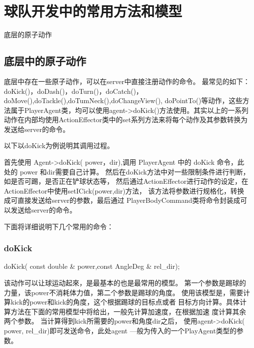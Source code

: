 \section{球队开发中的常用方法和模型}
底层的原子动作



\subsection{底层中的原子动作}
底层中存在一些原子动作，可以在server中直接注册动作的命令。
最常见的如下：doKick()，doDash()，doTurn()，doCatch()， doMove(),doTackle(),doTumNeck(),doChangeView(), doPointTo()等动作，这些方法属于PlayerAgent类，均可以使用agent->doKick()方法使用。其实以上的一系列动作在内部均使用ActionEffector类中的set系列方法来将每个动作及其参数转换为发送给server的命令。

以下以doKick为例说明其调用过程。

首先使用 Agent->doKick( power，dir),调用 PlayerAgent 中的 doKick 命令，此处的 power 和dir需要自己计算。
然后在doKick方法中对一些限制条件进行判断，如是否可踢，是否正在铲球状态等，
然后通过ActionEffector进行动作的设定，在ActionEffector中使用setICick(power,dir)方法， 该方法将参数进行规格化，转换成可直接发送给server的参数，最后通过 PlayerBodyCommand类将命令封装成可以发送给server的命令。

下面将详细说明下几个常用的命令：
\subsubsection{doKick}

\begin{Code}
	doKick( const double & power,const AngleDeg & rel_dir);
\end{Code}

该动作可以让球运动起來，是最基本的也是最常用的模型。
第一个参数是踢球的力量，该power不消耗体力值，第二个参数是踢球的角度。 使用该模型是，需要计算kick的power和kick的角度，这个根据踢球的目标点或者 目标方向计算。具体计算方法在下面的常用模型中将给出，一般先计算加速度，在根据加速 度计算其余两个参数。
当计算得到kick所需要的power和角度dir之后，
使用agent->doKick( power, rel_dir)即可发送命令，此处agent —般为传入的一个PlayAgent类型的参数。

